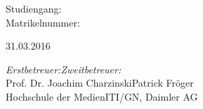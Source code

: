 \documentclass[../main.tex]{subfiles}
\begin{document}

\begin{titlepage}
	\centering
	{\scshape\LARGE
		\Hochschule
	\par}
	\vspace{1cm}
	{\scshape\Large
		\Dokument
	\par}
	\vspace{1.5cm}
	{\LARGE\bfseries
		\Thema
	\par}
	\vspace{2cm}
	{\large\itshape
		\Autor
	\par}
	\vspace{0.5cm}
	{\large
		Studiengang: \Studiengang\: \Matrikelnummer\\
	\par}
	\vspace{1.5cm}
	{\large{}31.03.2016\par{}}
	\vfill
	{\large
		\emph{Erstbetreuer:}\hfill\emph{Zweitbetreuer:}\\
		Prof. Dr. Joachim Charzinski\hfill Patrick Fröger\\
		Hochschule der Medien\hfill ITI/GN, Daimler AG
	\par}
\end{titlepage}
\end{document}
